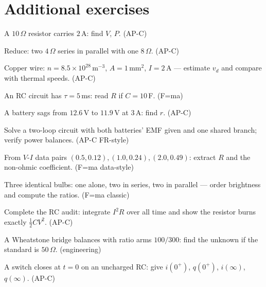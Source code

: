 \section*{Additional exercises}

\begin{exercise}[easy]
A $10\,\Omega$ resistor carries $2$\,A: find $V$, $P$. (AP-C)
\end{exercise}
\begin{exercise}[easy]
Reduce: two $4\,\Omega$ series in parallel with one $8\,\Omega$. (AP-C)
\end{exercise}
\begin{exercise}[easy]
Copper wire: $n=8.5\times10^{28}$\,m$^{-3}$, $A=1$\,mm$^{2}$,
$I=2$\,A --- estimate $v_d$ and compare with thermal speeds. (AP-C)
\end{exercise}
\begin{exercise}[easy]
An RC circuit has $\tau=5$\,ms: read $R$ if $C=10$\,\textmu F. (F=ma)
\end{exercise}
\begin{exercise}[easy]
A battery sags from $12.6$\,V to $11.9$\,V at $3$\,A: find $r$. (AP-C)
\end{exercise}
\begin{exercise}[medium]
Solve a two-loop circuit with both batteries' EMF given and one shared
branch; verify power balances. (AP-C FR-style)
\end{exercise}
\begin{exercise}[medium]
From $V$-$I$ data pairs $(0.5,0.12),(1.0,0.24),(2.0,0.49)$: extract
$R$ and the non-ohmic coefficient. (F=ma data-style)
\end{exercise}
\begin{exercise}[medium]
Three identical bulbs: one alone, two in series, two in parallel ---
order brightness and compute the ratios. (F=ma classic)
\end{exercise}
\begin{exercise}[medium]
Complete the RC audit: integrate $I^{2}R$ over all time and show the
resistor burns exactly $\tfrac12CV^{2}$. (AP-C)
\end{exercise}
\begin{exercise}[medium]
A Wheatstone bridge balances with ratio arms $100/300$: find the
unknown if the standard is $50\,\Omega$. (engineering)
\end{exercise}
\begin{exercise}[medium]
A switch closes at $t=0$ on an uncharged RC: give $i(0^+)$, $q(0^+)$,
$i(\infty)$, $q(\infty)$. (AP-C)
\end{exercise}
